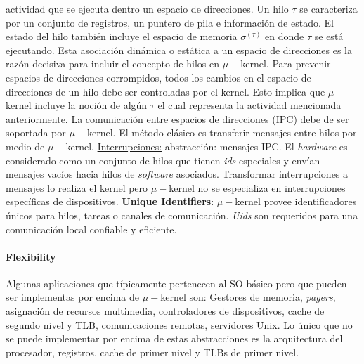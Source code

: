 actividad que se ejecuta dentro un espacio de direcciones. Un hilo $\tau$ se caracteriza por un conjunto de registros, un puntero de pila e información de estado. El estado del hilo también incluye el espacio de memoria $\sigma^{(\tau)}$ en donde $\tau$ se está ejecutando. Esta asociación dinámica o estática a un espacio de direcciones es la razón decisiva para incluir el concepto de hilos en $\mu-$kernel. Para prevenir espacios de direcciones corrompidos, todos los cambios en el espacio de direcciones de un hilo debe ser controladas por el kernel. Esto implica que $\mu-$kernel incluye la noción de algún $\tau$ el cual representa la actividad mencionada anteriormente. La comunicación entre espacios de direcciones (IPC) debe de ser soportada por $\mu-$kernel. El método clásico es transferir mensajes entre hilos por medio de $\mu-$kernel. \underline{Interrupciones:} abstracción: mensajes IPC. El \textit{hardware} es considerado como un conjunto de hilos que tienen \textit{ids} especiales y envían mensajes vacíos hacia hilos de \textit{software} asociados. Transformar interrupciones a mensajes lo realiza el kernel pero $\mu-$kernel no se especializa en interrupciones específicas de dispositivos. \textbf{Unique Identifiers}: $\mu-$kernel provee identificadores únicos para hilos, tareas o canales de comunicación. \textit{Uids} son requeridos para una comunicación local confiable y eficiente.

\paragraph{\textnormal{\textbf{Flexibility}}}
Algunas aplicaciones que típicamente pertenecen al SO básico pero que pueden ser implementas por encima de $\mu-$kernel son: Gestores de memoria, \textit{pagers}, asignación de recursos multimedia, controladores de dispositivos, cache de segundo nivel y TLB, comunicaciones remotas, servidores Unix. Lo único que no se puede implementar por encima de estas abstracciones es la arquitectura del procesador, registros, cache de primer nivel y TLBs de primer nivel. 

